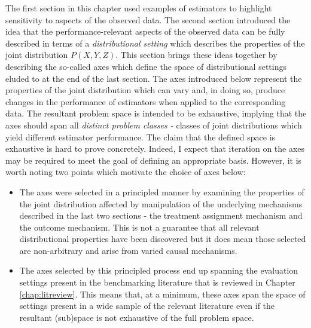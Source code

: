 \documentclass[../main.tex]{subfiles}
\begin{document}
\vspace{\baselineskip}
The first section in this chapter used examples of estimators to highlight sensitivity to aspects of the observed data. The second section introduced the idea that the performance-relevant aspects of the observed data can be fully described in terms of a \textit{distributional setting} which describes the properties of the joint distribution  \( P \left( X, Y, Z \right)  \). This section brings these ideas together by describing the so-called axes which define the space of distributional settings eluded to at the end of the last section. The axes introduced below represent the properties of the joint distribution which can vary and, in doing so, produce changes in the performance of estimators when applied to the corresponding data. The resultant problem space is intended to be exhaustive, implying that the axes should span all \textit{distinct problem classes - }classes of joint distributions which yield different estimator performance. The claim that the defined space is exhaustive is hard to prove concretely. Indeed, I expect that iteration on the axes may be required to meet the goal of defining an appropriate basis. However, it is worth noting two points which motivate the choice of axes below:\par


\vspace{\baselineskip}
\begin{itemize}
	\item The axes were selected in a principled manner by examining the properties of the joint distribution affected by manipulation of the underlying mechanisms described in the last two sections - the treatment assignment mechanism and the outcome mechanism. This is not a guarantee that all relevant distributional properties have been discovered but it does mean those selected are non-arbitrary and arise from varied causal mechanisms.\par


\vspace{\baselineskip}
	\item The axes selected by this principled process end up spanning the evaluation settings present in the benchmarking literature that is reviewed in Chapter \ref{chap:litreview}. This means that, at a minimum, these axes span the space of settings present in a wide sample of the relevant literature even if the resultant (sub)space is not exhaustive of the full problem space.
\end{itemize}\par
\end{document}
